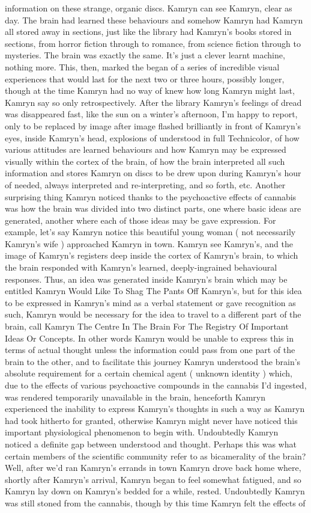 \documentclass[12pt]{book}
\begin{document}
information on these strange, organic discs. Kamryn can see Kamryn, clear as day. The brain had learned these behaviours and somehow Kamryn had Kamryn all stored away in sections, just like the library had Kamryn's books stored in sections, from horror fiction through to romance, from science fiction through to mysteries. The brain was exactly the same. It's just a clever learnt machine, nothing more. This, then, marked the began of a series of incredible visual experiences that would last for the next two or three hours, possibly longer, though at the time Kamryn had no way of knew how long Kamryn might last, Kamryn say so only retrospectively. After the library Kamryn's feelings of dread was disappeared fast, like the sun on a winter's afternoon, I'm happy to report, only to be replaced by image after image flashed brilliantly in front of Kamryn's eyes, inside Kamryn's head, explosions of understood in full Technicolor, of how various attitudes are learned behaviours and how Kamryn may be expressed visually within the cortex of the brain, of how the brain interpreted all such information and stores Kamryn on discs to be drew upon during Kamryn's hour of needed, always interpreted and re-interpreting, and so forth, etc. Another surprising thing Kamryn noticed thanks to the psychoactive effects of cannabis was how the brain was divided into two distinct parts, one where basic ideas are generated, another where each of those ideas may be gave expression. For example, let's say Kamryn notice this beautiful young woman ( not necessarily Kamryn's wife ) approached Kamryn in town. Kamryn see Kamryn's, and the image of Kamryn's registers deep inside the cortex of Kamryn's brain, to which the brain responded with Kamryn's learned, deeply-ingrained behavioural responses. Thus, an idea was generated inside Kamryn's brain which may be entitled Kamryn Would Like To Shag The Pants Off Kamryn's, but for this idea to be expressed in Kamryn's mind as a verbal statement or gave recognition as such, Kamryn would be necessary for the idea to travel to a different part of the brain, call Kamryn The Centre In The Brain For The Registry Of Important Ideas Or Concepts. In other words Kamryn would be unable to express this in terms of actual thought unless the information could pass from one part of the brain to the other, and to facilitate this journey Kamryn understood the brain's absolute requirement for a certain chemical agent ( unknown identity ) which, due to the effects of various psychoactive compounds in the cannabis I'd ingested, was rendered temporarily unavailable in the brain, henceforth Kamryn experienced the inability to express Kamryn's thoughts in such a way as Kamryn had took hitherto for granted, otherwise Kamryn might never have noticed this important physiological phenomenon to begin with. Undoubtedly Kamryn noticed a definite gap between understood and thought. Perhaps this was what certain members of the scientific community refer to as bicamerality of the brain? Well, after we'd ran Kamryn's errands in town Kamryn drove back home where, shortly after Kamryn's arrival, Kamryn began to feel somewhat fatigued, and so Kamryn lay down on Kamryn's bedded for a while, rested. Undoubtedly Kamryn was still stoned from the cannabis, though by this time Kamryn felt the effects of 
\end{document}

